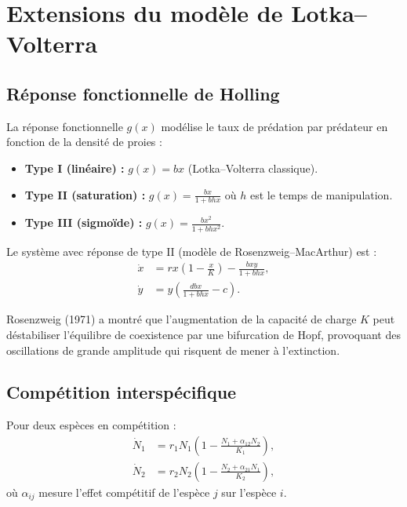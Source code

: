 \section{Extensions du mod\`ele de Lotka--Volterra}
\label{sec:extensions}

\subsection{R\'eponse fonctionnelle de Holling}

\begin{definition}
La r\'eponse fonctionnelle $g(x)$ mod\'elise le taux de pr\'edation
par pr\'edateur en fonction de la densit\'e de proies :
\begin{itemize}
  \item \textbf{Type I (lin\'eaire) :} $g(x) = bx$ (Lotka--Volterra classique).
  \item \textbf{Type II (saturation) :} $g(x) = \frac{bx}{1+bhx}$
    o\`u $h$ est le temps de manipulation.
  \item \textbf{Type III (sigmo\"ide) :} $g(x) = \frac{bx^2}{1+bhx^2}$.
\end{itemize}
\end{definition}

Le syst\`eme avec r\'eponse de type II (mod\`ele de Rosenzweig--MacArthur)
est :
\begin{align}
  \dot{x} &= rx\left(1-\frac{x}{K}\right) - \frac{bxy}{1+bhx}, \\
  \dot{y} &= y\left(\frac{dbx}{1+bhx} - c\right).
\end{align}

\begin{attention}[title=\textbf{Paradoxe de l'enrichissement}]
Rosenzweig (1971) a montr\'e que l'augmentation de la capacit\'e de
charge $K$ peut d\'estabiliser l'\'equilibre de coexistence par une
bifurcation de Hopf, provoquant des oscillations de grande amplitude
qui risquent de mener \`a l'extinction.
\end{attention}

\subsection{Comp\'etition intersp\'ecifique}

\begin{definition}
Pour deux esp\`eces en comp\'etition :
\begin{align}
  \dot{N}_1 &= r_1 N_1\left(1 - \frac{N_1 + \alpha_{12}N_2}{K_1}\right), \\
  \dot{N}_2 &= r_2 N_2\left(1 - \frac{N_2 + \alpha_{21}N_1}{K_2}\right),
\end{align}
o\`u $\alpha_{ij}$ mesure l'effet comp\'etitif de l'esp\`ece $j$ sur
l'esp\`ece $i$.
\end{definition}

